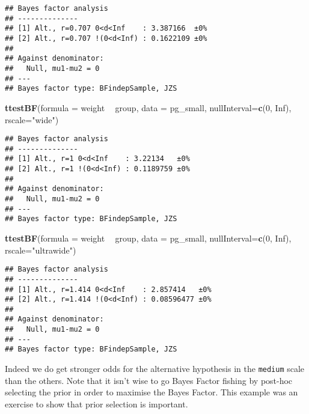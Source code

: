 \documentclass[
]{book}
\newenvironment{Shaded}{\begin{snugshade}}{\end{snugshade}}
\newcommand{\DataTypeTok}[1]{\textcolor[rgb]{0.13,0.29,0.53}{#1}}
\newcommand{\DecValTok}[1]{\textcolor[rgb]{0.00,0.00,0.81}{#1}}
\newcommand{\KeywordTok}[1]{\textcolor[rgb]{0.13,0.29,0.53}{\textbf{#1}}}
\newcommand{\NormalTok}[1]{#1}
\newcommand{\OperatorTok}[1]{\textcolor[rgb]{0.81,0.36,0.00}{\textbf{#1}}}
\newcommand{\OtherTok}[1]{\textcolor[rgb]{0.56,0.35,0.01}{#1}}
\newcommand{\StringTok}[1]{\textcolor[rgb]{0.31,0.60,0.02}{#1}}
\begin{document}
\begin{verbatim}
## Bayes factor analysis
## --------------
## [1] Alt., r=0.707 0<d<Inf    : 3.387166  ±0%
## [2] Alt., r=0.707 !(0<d<Inf) : 0.1622109 ±0%
## 
## Against denominator:
##   Null, mu1-mu2 = 0 
## ---
## Bayes factor type: BFindepSample, JZS
\end{verbatim}

\begin{Shaded}
\begin{Highlighting}[]
\KeywordTok{ttestBF}\NormalTok{(}\DataTypeTok{formula =}\NormalTok{  weight }\OperatorTok{~}\StringTok{ }\NormalTok{group, }\DataTypeTok{data =}\NormalTok{ pg_small, }\DataTypeTok{nullInterval=}\KeywordTok{c}\NormalTok{(}\DecValTok{0}\NormalTok{, }\OtherTok{Inf}\NormalTok{), }\DataTypeTok{rscale=}\StringTok{"wide"}\NormalTok{)}
\end{Highlighting}
\end{Shaded}

\begin{verbatim}
## Bayes factor analysis
## --------------
## [1] Alt., r=1 0<d<Inf    : 3.22134   ±0%
## [2] Alt., r=1 !(0<d<Inf) : 0.1189759 ±0%
## 
## Against denominator:
##   Null, mu1-mu2 = 0 
## ---
## Bayes factor type: BFindepSample, JZS
\end{verbatim}

\begin{Shaded}
\begin{Highlighting}[]
\KeywordTok{ttestBF}\NormalTok{(}\DataTypeTok{formula =}\NormalTok{  weight }\OperatorTok{~}\StringTok{ }\NormalTok{group, }\DataTypeTok{data =}\NormalTok{ pg_small, }\DataTypeTok{nullInterval=}\KeywordTok{c}\NormalTok{(}\DecValTok{0}\NormalTok{, }\OtherTok{Inf}\NormalTok{), }\DataTypeTok{rscale=}\StringTok{"ultrawide"}\NormalTok{)}
\end{Highlighting}
\end{Shaded}

\begin{verbatim}
## Bayes factor analysis
## --------------
## [1] Alt., r=1.414 0<d<Inf    : 2.857414   ±0%
## [2] Alt., r=1.414 !(0<d<Inf) : 0.08596477 ±0%
## 
## Against denominator:
##   Null, mu1-mu2 = 0 
## ---
## Bayes factor type: BFindepSample, JZS
\end{verbatim}

Indeed we do get stronger odds for the alternative hypothesis in the \texttt{medium} scale than the others. Note that it isn't wise to go Bayes Factor fishing by post-hoc selecting the prior in order to maximise the Bayes Factor. This example was an exercise to show that prior selection is important.
\end{document}
